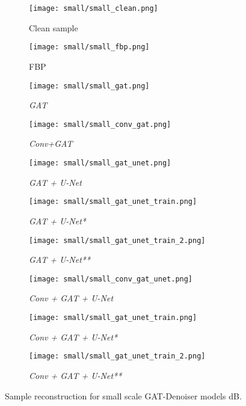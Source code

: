 \begin{figure}[H]
  \captionsetup[subfigure]{justification=centering}
  \centering
  \begin{subfigure}[t]{0.16\textwidth}
    \texttt{[image: small/small\_clean.png]}
    \caption{Clean sample}
    \label{fig:small_clean_sample_overview}
  \end{subfigure} \hfill
  \begin{subfigure}[t]{0.16\textwidth}
    \texttt{[image: small/small\_fbp.png]}
    \caption{FBP}
  \end{subfigure} \hfill
  \begin{subfigure}[t]{0.16\textwidth}
    \texttt{[image: small/small\_gat.png]}
    \caption{\textit{GAT}}
  \end{subfigure} \hfill
  \begin{subfigure}[t]{0.16\textwidth}
    \texttt{[image: small/small\_conv\_gat.png]}
    \caption{\textit{Conv+GAT}}
  \end{subfigure} \hfill
  \begin{subfigure}[t]{0.16\textwidth}
    \texttt{[image: small/small\_gat\_unet.png]}
    \caption{\textit{GAT + U-Net}}
  \end{subfigure}

  \begin{subfigure}[t]{0.16\textwidth}
    \texttt{[image: small/small\_gat\_unet\_train.png]}
    \caption{\textit{GAT + U-Net*}}
  \end{subfigure} \hfill
  \begin{subfigure}[t]{0.16\textwidth}
    \texttt{[image: small/small\_gat\_unet\_train\_2.png]}
    \caption{\textit{GAT + U-Net**}}
  \end{subfigure} \hfill
  \begin{subfigure}[t]{0.16\textwidth}
    \texttt{[image: small/small\_conv\_gat\_unet.png]}
    \caption{\textit{Conv + GAT + U-Net}}
  \end{subfigure} \hfill
  \begin{subfigure}[t]{0.16\textwidth}
    \texttt{[image: small/small\_gat\_unet\_train.png]}
    \caption{\textit{Conv + GAT + U-Net*}}
  \end{subfigure} \hfill
  \begin{subfigure}[t]{0.16\textwidth}
    \texttt{[image: small/small\_gat\_unet\_train\_2.png]}
    \caption{\textit{Conv + GAT + U-Net**}}
  \end{subfigure}
  \caption{Sample reconstruction for small scale GAT-Denoiser models  dB.}
  \label{fig:small_components_overview}
\end{figure}

